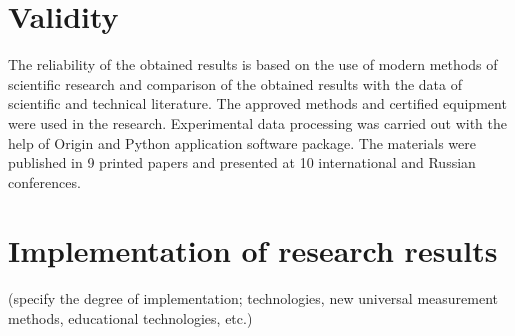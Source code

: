 \section*{Validity}
The reliability of the obtained results is based on the use of modern methods of scientific research and comparison of the obtained results with the data of scientific and technical literature. The approved methods and certified equipment were used in the research. Experimental data processing was carried out with the help of Origin and Python application software package. The materials were published in 9 printed papers and presented at 10 international and Russian conferences.

\section*{Implementation of research results}
(specify the degree of implementation; technologies, new universal measurement methods, educational technologies, etc.)

